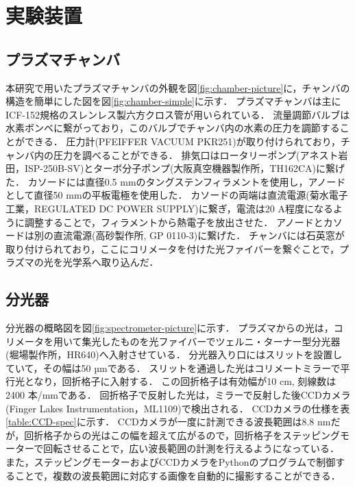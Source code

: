 \chapter{実験装置}
\section{プラズマチャンバ}
本研究で用いたプラズマチャンバの外観を図\ref{fig:chamber-picture}に，チャンバの構造を簡単にした図を図\ref{fig:chamber-simple}に示す．
プラズマチャンバは主にICF-152規格のスレンレス製六方クロス管が用いられている．
流量調節バルブは水素ボンベに繋がっており，このバルブでチャンバ内の水素の圧力を調節することができる．
圧力計(PFEIFFER VACUUM PKR251)が取り付けられており，チャンバ内の圧力を調べることができる．
排気口はロータリーポンプ(アネスト岩田，ISP-250B-SV)とターボ分子ポンプ(大阪真空機器製作所，TH162CA)に繋げた．
カソードには直径0.5 mmのタングステンフィラメントを使用し，アノードとして直径50 mmの平板電極を使用した．
カソードの両端は直流電源(菊水電子工業，REGULATED DC POWER SUPPLY)に繋ぎ，電流は20 A程度になるように調整することで，フィラメントから熱電子を放出させた．
アノードとカソードは別の直流電源(高砂製作所, GP 0110-3)に繋げた．
チャンバには石英窓が取り付けられており，ここにコリメータを付けた光ファイバーを繋ぐことで，プラズマの光を光学系へ取り込んだ．

\section{分光器}
分光器の概略図を図\ref{fig:spectrometer-picture}に示す．
プラズマからの光は，コリメータを用いて集光したものを光ファイバーでツェルニ・ターナー型分光器(堀場製作所，HR640)へ入射させている．
分光器入り口にはスリットを設置していて，その幅は50 µmである．
スリットを通過した光はコリメートミラーで平行光となり，回折格子に入射する．
この回折格子は有効幅が10 cm, 刻線数は2400 本/mmである．
回折格子で反射した光は，ミラーで反射した後CCDカメラ(Finger Lakes Instrumentation，ML1109)で検出される．
CCDカメラの仕様\cite{CCD-spec}を表\ref{table:CCD-spec}に示す．
CCDカメラが一度に計測できる波長範囲は8.8 nmだが，回折格子からの光はこの幅を超えて広がるので，回折格子をステッピングモーターで回転させることで，広い波長範囲の計測を行えるようになっている．
また，ステッピングモーターおよびCCDカメラをPythonのプログラムで制御することで，複数の波長範囲に対応する画像を自動的に撮影することができる．